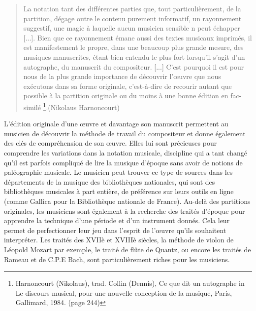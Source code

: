 \begin{quote}
	La notation tant des différentes parties que, tout particulièrement, de la partition, dégage outre le contenu purement informatif, un rayonnement suggestif, une magie à laquelle aucun musicien sensible n peut échapper [...]. Bien que ce rayonnement émane aussi des textes musicaux imprimés, il est manifestement le propre, dans une beaucoup plus grande mesure, des musiques manuscrites, étant bien entendu le plus fort lorsqu'il s'agit d'un autographe, du manuscrit du compositeur. [...] C'est pourquoi il est pour nous de la plus grande importance de découvrir l'œuvre que nous exécutons dans sa forme originale, c'est-à-dire de recourir autant que possible à la partition originale ou du moins à une bonne édition en fac-similé \footnote{Harnoncourt (Nikolaus), trad. Collin (Dennis), Ce que dit un autographe in Le discours musical, pour une nouvelle conception de la musique, Paris, Gallimard, 1984. (page 244)}.(Nikolaus Harnoncourt)
\end{quote}

L'édition originale d'une œuvre et davantage son manuscrit permettent au musicien de découvrir la méthode de travail du compositeur et donne également des clés de compréhension de son œuvre. Elles lui sont précieuses pour comprendre les variations dans la notation musicale, discipline qui a tant changé qu'il est parfois compliqué de lire la musique d'époque sans avoir de notions de paléographie musicale. 
Le musicien peut trouver ce type de sources dans les départements de la musique des bibliothèques nationales, qui sont des bibliothèques musicales à part entière, de préférence sur leurs outils en ligne (comme Gallica pour la Bibliothèque nationale de France).
Au-delà des partitions originales, les musiciens sont également à la recherche des traités d'époque pour apprendre la technique d'une période et d'un instrument donnés. Cela leur permet de perfectionner leur jeu dans l'esprit de l'œuvre qu'ils souhaitent interpréter. Les traités des XVIIè et XVIIIè siècles, la méthode de violon de Léopold Mozart par exemple, le traité de flûte de Quantz, ou encore les traités de Rameau et de C.P.E Bach, sont particulièrement riches pour les musiciens. 

